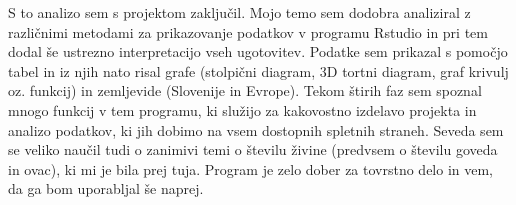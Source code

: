 \documentclass[11pt,a4paper]{article}
\begin{document}
\newline
\newline
S to analizo sem s projektom zaključil. Mojo temo sem dodobra analiziral z različnimi metodami za prikazovanje podatkov v programu Rstudio in pri tem dodal še ustrezno interpretacijo vseh ugotovitev. Podatke sem prikazal s pomočjo tabel in iz njih nato risal grafe (stolpični diagram, 3D tortni diagram, graf krivulj oz. funkcij) in zemljevide (Slovenije in Evrope). Tekom štirih faz sem spoznal mnogo funkcij v tem programu, ki služijo za kakovostno izdelavo projekta in analizo podatkov, ki jih dobimo na vsem dostopnih spletnih straneh. Seveda sem se veliko naučil tudi o zanimivi temi o številu živine (predvsem o številu goveda in ovac), ki mi je bila prej tuja. Program je zelo dober za tovrstno delo in vem, da ga bom uporabljal še naprej.
\end{document}
